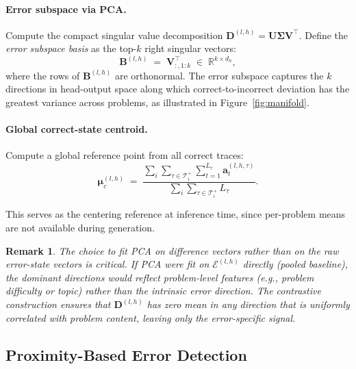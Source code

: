 \documentclass{article}
\newtheorem{remark}{Remark}
\newcommand{\R}{\mathbb{R}}
\newcommand{\ba}{\bm{a}}
\newcommand{\bmu}{\bm{\mu}}
\newcommand{\bB}{\bm{B}}
\newcommand{\bD}{\bm{D}}
\begin{document}
\paragraph{Error subspace via PCA.}
Compute the compact singular value decomposition
$\bD^{(l,h)} = \bm{U}\bm{\Sigma}\bm{V}^\top$.
Define the \emph{error subspace basis} as the top-$k$ right singular vectors:
\begin{equation}
    \bB^{(l,h)}
    \;=\;
    \bm{V}_{:,1:k}^\top
    \;\in\; \R^{k \times d_h},
    \label{eq:basis}
\end{equation}
where the rows of $\bB^{(l,h)}$ are orthonormal. The error subspace captures
the $k$ directions in head-output space along which correct-to-incorrect
deviation has the greatest variance across problems, as illustrated in
Figure~\ref{fig:manifold}. 
\vspace{0.2em}
\paragraph{Global correct-state centroid.}
Compute a global reference point from all correct traces:
\begin{equation}
    \bmu_c^{(l,h)}
    \;=\;
    \frac{\displaystyle\sum_{i}\sum_{\tau \in \mathcal{T}_i^+}
    \sum_{t=1}^{L_\tau} \ba_t^{(l,h,\tau)}}
    {\displaystyle\sum_{i}\sum_{\tau \in \mathcal{T}_i^+} L_\tau}.
    \label{eq:global_mean}
\end{equation}

This serves as the centering reference at inference time, since per-problem
means are not available during generation.
\begin{remark}
    \label{rem:contrastive}
    The choice to fit PCA on \emph{difference vectors} rather than on the raw error-state vectors is critical. If PCA were fit on $\mathcal{E}^{(l,h)}$ directly (pooled baseline), the dominant directions would reflect problem-level features (e.g., problem difficulty or topic) rather than the intrinsic error direction. The contrastive construction ensures that $\bD^{(l,h)}$ has zero mean in any direction that is uniformly correlated with problem content, leaving only the error-specific signal.
\end{remark}
\subsection{Proximity-Based Error Detection}
\label{sec:detection}
\end{document}
